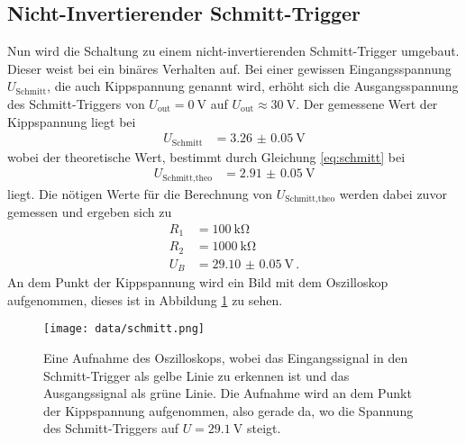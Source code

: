 \subsection{Nicht-Invertierender Schmitt-Trigger}
Nun wird die Schaltung zu einem nicht-invertierenden Schmitt-Trigger umgebaut.
Dieser weist bei ein binäres Verhalten auf.
Bei einer gewissen Eingangsspannung $U_\text{Schmitt}$, die auch Kippspannung genannt wird, erhöht sich die Ausgangsspannung des Schmitt-Triggers von $U_\text{out}= \SI{0}{\V}$ auf $U_\text{out}\approx \SI{30}{\V}$.
Der gemessene Wert der Kippspannung liegt bei 
\begin{align*}
    U_\text{Schmitt} &= \SI{3.26(5)}{\V}
\end{align*}
wobei der theoretische Wert, bestimmt durch Gleichung \eqref{eq:schmitt} bei 
\begin{align*}
    U_\text{Schmitt,theo} &= \SI{2.91(5)}{\V}
\end{align*}
liegt.
Die nötigen Werte für die Berechnung von $ U_\text{Schmitt,theo}$ werden dabei zuvor gemessen und ergeben sich zu
\begin{align*}
    R_1 &= \SI{100}{\kilo\ohm}\\
    R_2 &= \SI{1000}{\kilo\ohm}\\
    U_B &= \SI{29.10(5)}{\V} \, .
\end{align*}
An dem Punkt der Kippspannung wird ein Bild mit dem Oszilloskop aufgenommen, dieses ist in Abbildung \ref{fig:schmitt_oszi} zu sehen.
\begin{figure}[H]
    \centering
    \texttt{[image: data/schmitt.png]}
    \caption{Eine Aufnahme des Oszilloskops, wobei das Eingangssignal in den Schmitt-Trigger als gelbe Linie zu erkennen ist und das Ausgangssignal als grüne Linie.
    Die Aufnahme wird an dem Punkt der Kippspannung aufgenommen, also gerade da, wo die Spannung des Schmitt-Triggers auf $U=\SI{29.1}{\V}$ steigt.}
    \label{fig:schmitt_oszi}
\end{figure}
\FloatBarrier
